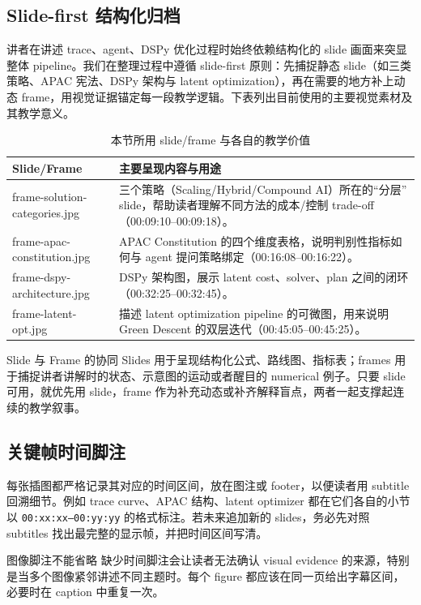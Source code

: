 \documentclass[a4paper]{article}
\begin{document}
\subsection{Slide-first 结构化归档}
讲者在讲述 trace、agent、DSPy 优化过程时始终依赖结构化的 slide 画面来突显整体 pipeline。我们在整理过程中遵循 slide-first 原则：先捕捉静态 slide（如三类策略、APAC 宪法、DSPy 架构与 latent optimization），再在需要的地方补上动态 frame，用视觉证据锚定每一段教学逻辑。下表列出目前使用的主要视觉素材及其教学意义。
\begin{table}[H]
\centering
\begin{tabular}{lp{8cm}}
\toprule
Slide/Frame & 主要呈现内容与用途 \\
\midrule
frame-solution-categories.jpg & 三个策略（Scaling/Hybrid/Compound AI）所在的“分层” slide，帮助读者理解不同方法的成本/控制 trade-off（00:09:10--00:09:18）。 \\
frame-apac-constitution.jpg & APAC Constitution 的四个维度表格，说明判别性指标如何与 agent 提问策略绑定（00:16:08--00:16:22）。 \\
frame-dspy-architecture.jpg & DSPy 架构图，展示 latent cost、solver、plan 之间的闭环（00:32:25--00:32:45）。 \\
frame-latent-opt.jpg & 描述 latent optimization pipeline 的可微图，用来说明 Green Descent 的双层迭代（00:45:05--00:45:25）。 \\
\bottomrule
\end{tabular}
\caption{本节所用 slide/frame 与各自的教学价值}
\end{table}
\begin{knowledgebox}{Slide 与 Frame 的协同}
Slides 用于呈现结构化公式、路线图、指标表；frames 用于捕捉讲者讲解时的状态、示意图的运动或者醒目的 numerical 例子。只要 slide 可用，就优先用 slide，frame 作为补充动态或补齐解释盲点，两者一起支撑起连续的教学叙事。
\end{knowledgebox}

\subsection{关键帧时间脚注}
每张插图都严格记录其对应的时间区间，放在图注或 footer，以便读者用 subtitle 回溯细节。例如 trace curve、APAC 结构、latent optimizer 都在它们各自的小节以 \texttt{00:xx:xx--00:yy:yy} 的格式标注。若未来追加新的 slides，务必先对照 subtitles 找出最完整的显示帧，并把时间区间写清。
\begin{warningbox}{图像脚注不能省略}
缺少时间脚注会让读者无法确认 visual evidence 的来源，特别是当多个图像紧邻讲述不同主题时。每个 figure 都应该在同一页给出字幕区间，必要时在 caption 中重复一次。
\end{warningbox}
\end{document}
